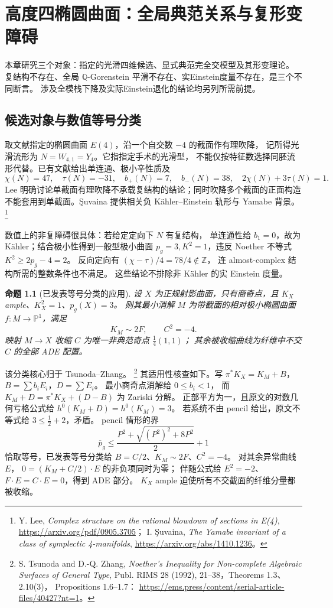 \documentclass[UTF8,fontset=fandol,zihao=-4,oneside,openany]{ctexbook}
\theoremstyle{cjkplain}
\newtheorem{proposition}[theorem]{命题}
\numberwithin{equation}{chapter}
\begin{document}
\chapter{高度四椭圆曲面：全局典范关系与复形变障碍}
\label{ALG:chapter}

本章研究三个对象：指定的光滑四维候选、显式典范完全交模型及其形变理论。
复结构不存在、全局 $\mathbb Q$-Gorenstein 平滑不存在、实Einstein度量不存在，是三个不同断言。
涉及全模栈下降及实际Einstein退化的结论均另列所需前提。

\section{候选对象与数值等号分类}

取文献指定的椭圆曲面 $E(4)$，沿一个自交数 $-4$ 的截面作有理吹降，
记所得光滑流形为 $N=W_{4,1}=Y_4$。它指指定手术的光滑型，
不能仅按特征数选择同胚流形代替。已有文献给出单连通、极小辛性质及
\begin{equation}
\chi(N)=47,\quad \tau(N)=-31,\quad b_+(N)=7,\quad b_-(N)=38,\quad
2\chi(N)+3\tau(N)=1.
\label{ALG:topology}
\end{equation}
Lee 明确讨论单截面有理吹降不承载复结构的结论；同时吹降多个截面的正面构造
不能套用到单截面。Şuvaina 提供相关负 Kähler--Einstein 轨形与 Yamabe 背景。
\footnote{Y. Lee, \emph{Complex structure on the rational blowdown of sections in
E(4)}, \url{https://arxiv.org/pdf/0905.3705}；
I. Şuvaina, \emph{The Yamabe invariant of a class of symplectic 4-manifolds},
\url{https://arxiv.org/abs/1410.1236}。}

数值上的非复障碍很具体：若给定定向下 $N$ 有复结构，
单连通性给 $b_1=0$，故为 Kähler；结合极小性得到一般型极小曲面
$p_g=3,K^2=1$，违反 Noether 不等式 $K^2\ge2p_g-4=2$。
反向定向有 $(\chi-\tau)/4=78/4\notin\mathbb Z$，
连 almost-complex 结构所需的整数条件也不满足。
这些结论不排除非 Kähler 的实 Einstein 度量。

\begin{proposition}[已发表等号分类的应用]
\label{ALG:classification}
设 $X$ 为正规射影曲面，只有商奇点，且
$K_X$ ample、$K_X^2=1$、$p_g(X)=3$。
则其最小消解 $M$ 为带截面的相对极小椭圆曲面
$f:M\to\mathbb P^1$，满足
\[
K_M\sim2F,\qquad C^2=-4.
\]
映射 $M\to X$ 收缩 $C$ 为唯一非典范奇点 $\frac14(1,1)$；
其余被收缩曲线为纤维中不交 $C$ 的全部 ADE 配置。
\end{proposition}

该分类核心归于 Tsunoda--Zhang。
\footnote{S. Tsunoda and D.-Q. Zhang,
\emph{Noether's Inequality for Non-complete Algebraic Surfaces of General Type},
Publ. RIMS 28 (1992), 21--38，Theorems 1.3、2.10(3)，
Propositions 1.6--1.7：
\url{https://ems.press/content/serial-article-files/40427?nt=1}。}
其适用性核查如下。写
$\pi^*K_X=K_M+B$，$B=\sum b_iE_i$，$D=\sum E_i$。
最小商奇点消解给 $0\le b_i<1$，
而 $K_M+D=\pi^*K_X+(D-B)$ 为 Zariski 分解。
正部平方为一，且原文的对数几何亏格公式给
$h^0(K_M+D)=h^0(K_M)=3$。
若系统不由 pencil 给出，原文不等式给 $3\le\frac12+2$，矛盾。
pencil 情形的界
\[
\overline p_g\le
\frac{P^2+\sqrt{(P^2)^2+8P^2}}2+1
\]
恰取等号，已发表等号分类给 $B=C/2$、$K_M\sim2F$、$C^2=-4$。
对其余异常曲线 $E$，
$0=(K_M+C/2)\cdot E$ 的非负项同时为零；
伴随公式给 $E^2=-2$、$F\cdot E=C\cdot E=0$，得到 ADE 部分。
$K_X$ ample 迫使所有不交截面的纤维分量都被收缩。
\end{document}
